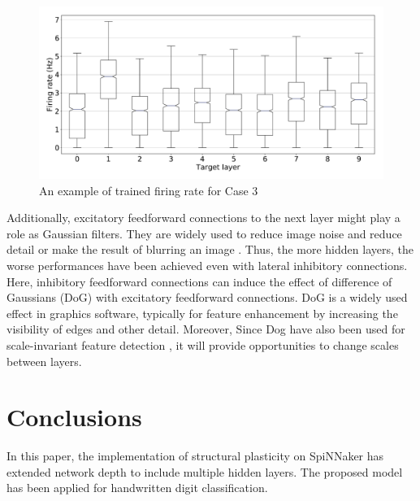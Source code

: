 \documentclass[preprint,12pt]{elsarticle}
\begin{document}
\begin{figure}[tbh]
    \centering
    \includegraphics[width=0.80\linewidth, trim=0cm 0cm 0cm 0cm, clip=true]{mnist_training_firing_rate_boxplot_case_3_rate_pynn8}
    \caption{An example of trained firing rate for Case 3}
    \label{fig:fr_bp_c3}
\end{figure}

Additionally, excitatory feedforward connections to the next layer might play a role as Gaussian filters. They are widely used  to reduce image noise and reduce detail or make the result of blurring an image \cite{nixon2019feature}. Thus, the more hidden layers, the worse performances have been achieved even with lateral inhibitory connections.
Here, inhibitory feedforward connections can induce the effect of difference of Gaussians (DoG) with excitatory feedforward connections. DoG is a widely used effect in graphics software, typically for feature enhancement by increasing the visibility of edges and other detail. Moreover, Since Dog have also been used for scale-invariant feature detection \cite{lowe2004distinctive, bay2006surf}, it will provide opportunities to change scales between layers. 



\section{Conclusions}\label{sec:conclusions}

In this paper, the implementation of structural plasticity on SpiNNaker has extended network depth to include multiple hidden layers. 
The proposed model has been applied for handwritten digit classification. 
\end{document}

